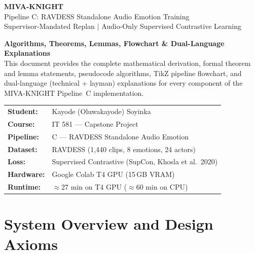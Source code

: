 \documentclass[12pt,a4paper]{article}
\theoremstyle{definition}
\theoremstyle{plain}
\theoremstyle{remark}
\begin{document}

\begin{titlepage}
\centering
\vspace*{1.8cm}
{\Huge\bfseries\color{NavyBlue} MIVA-KNIGHT}\\[0.5cm]
{\Large\color{SlateGray} Pipeline C: RAVDESS Standalone Audio Emotion Training}\\[0.3cm]
{\large\color{SlateGray} Supervisor-Mandated Replan $\mid$ Audio-Only Supervised Contrastive Learning}\\[1.4cm]

\begin{tcolorbox}[notebox,width=0.88\textwidth,
  title={Complete Technical Documentation --- Pipeline C}]
\centering
\textbf{Algorithms, Theorems, Lemmas, Flowchart \& Dual-Language Explanations}\\[0.4cm]
This document provides the complete mathematical derivation, formal
theorem and lemma statements, pseudocode algorithms, TikZ pipeline
flowchart, and dual-language (technical + layman) explanations for
every component of the MIVA-KNIGHT Pipeline~C implementation.
\end{tcolorbox}

\vspace{1.2cm}
\begin{tabular}{@{}ll}
\textbf{Student:}  & Kayode (Oluwakayode) Soyinka \\[3pt]
\textbf{Course:}   & IT 581 --- Capstone Project \\[3pt]
\textbf{Pipeline:} & C --- RAVDESS Standalone Audio Emotion \\[3pt]
\textbf{Dataset:}  & RAVDESS (1,440 clips, 8 emotions, 24 actors) \\[3pt]
\textbf{Loss:}     & Supervised Contrastive (SupCon, Khosla et al.\ 2020) \\[3pt]
\textbf{Hardware:} & Google Colab T4 GPU (15\,GB VRAM) \\[3pt]
\textbf{Runtime:}  & $\approx$27 min on T4 GPU ($\approx$60 min on CPU) \\
\end{tabular}

\vspace{2cm}
\tableofcontents
\end{titlepage}

\section{System Overview and Design Axioms}
\end{document}
